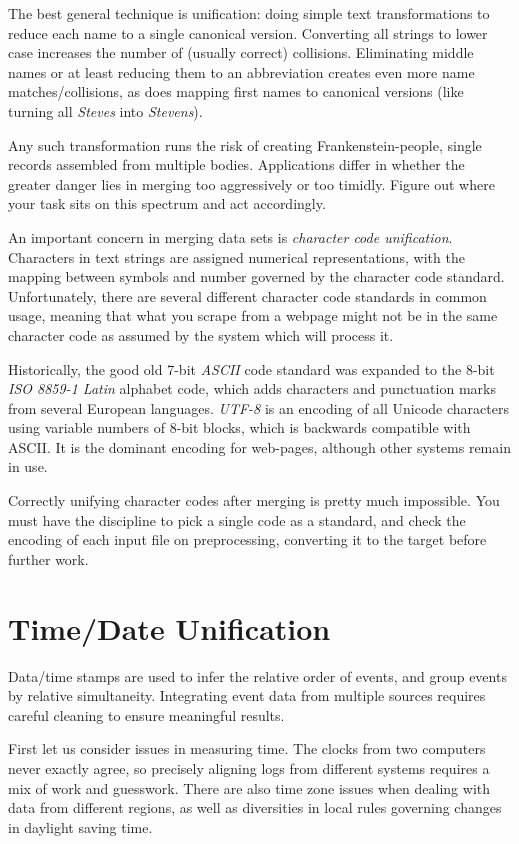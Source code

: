 \documentclass[10pt]{article}
\begin{document}
The best general technique is unification: doing simple text transformations to reduce each name to a single canonical version. Converting all strings to lower case increases the number of (usually correct) collisions. Eliminating middle names or at least reducing them to an abbreviation creates even more name matches/collisions, as does mapping first names to canonical versions (like turning all \textit{Steves} into \textit{Stevens}).

Any such transformation runs the risk of creating Frankenstein-people, single records assembled from multiple bodies. Applications differ in whether the greater danger lies in merging too aggressively or too timidly. Figure out where your task sits on this spectrum and act accordingly.

An important concern in merging data sets is \textit{character code unification}. Characters in text strings are assigned numerical representations, with the mapping between symbols and number governed by the character code standard. Unfortunately, there are several different character code standards in common usage, meaning that what you scrape from a webpage might not be in the same character code as assumed by the system which will process it.

Historically, the good old 7-bit \textit{ASCII} code standard was expanded to the 8-bit \textit{ISO 8859-1 Latin} alphabet code, which adds characters and punctuation marks from several European languages. \textit{UTF-8} is an encoding of all Unicode characters using variable numbers of 8-bit blocks, which is backwards compatible with ASCII. It is the dominant encoding for web-pages, although other systems remain in use.

Correctly unifying character codes after merging is pretty much impossible. You must have the discipline to pick a single code as a standard, and check the encoding of each input file on preprocessing, converting it to the target before further work.

\section*{Time/Date Unification}

Data/time stamps are used to infer the relative order of events, and group events by relative simultaneity. Integrating event data from multiple sources requires careful cleaning to ensure meaningful results.

First let us consider issues in measuring time. The clocks from two computers never exactly agree, so precisely aligning logs from different systems requires a mix of work and guesswork. There are also time zone issues when dealing with data from different regions, as well as diversities in local rules governing changes in daylight saving time.
\end{document}
